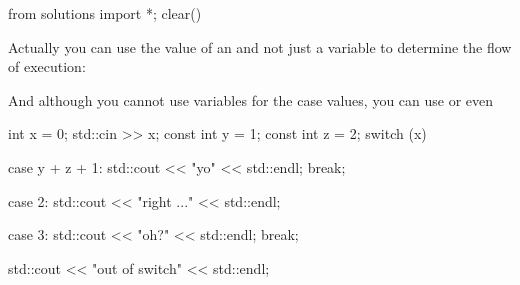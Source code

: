 \begin{python0}
from solutions import *; clear()
\end{python0}

Actually you can use the value of an  and not
just a variable to determine the flow of execution:

And although you cannot use variables for the case values, you can use
 or even 

\begin{console}[commandchars=\~\@\$]
int x = 0;
std::cin >> x;
const int y = 1;
const int z = 2;
switch (x)
{
        case y + z + 1:
             std::cout << "yo" << std::endl;
             break;
        
        case 2:
             std::cout << "right ..." << std::endl;

        case 3:
             std::cout << "oh?" << std::endl;
             break;
}
std::cout << "out of switch" << std::endl;
\end{console}

